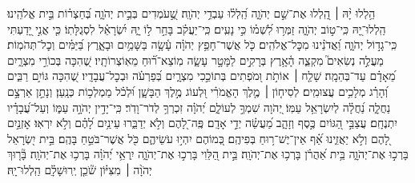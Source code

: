 \documentclass[twoside, openany, parskip=half, 11pt]{book}
\begin{document}
\begin{narrow}
הַ֥לְלוּ יָ֨הּ ׀  
הַֽ֭לְלוּ אֶת־שֵׁ֣ם יְהֹוָ֑ה הַֽ֝לְל֗וּ עַבְדֵ֥י יְהֹוָֽה׃
שֶׁ֣֭עֹמְדִים בְּבֵ֣ית יְהֹוָ֑ה בְּ֝חַצְר֗וֹת בֵּ֣ית אֱלֹהֵֽינוּ׃
הַֽלְלוּ־יָ֭הּ כִּֽי־ט֣וֹב יְהֹוָ֑ה זַמְּר֥וּ לִ֝שְׁמ֗וֹ כִּ֣י נָעִֽים׃
כִּֽי־יַעֲקֹ֗ב בָּחַ֣ר ל֣וֹ יָ֑הּ יִ֝שְׂרָאֵ֗ל לִסְגֻלָּתֽוֹ׃
כִּ֤י אֲנִ֣י יָ֭דַעְתִּי כִּֽי־גָד֣וֹל יְהֹוָ֑ה וַ֝אֲדֹנֵ֗ינוּ מִכׇּל־אֱלֹהִֽים׃
כֹּ֤ל אֲשֶׁר־חָפֵ֥ץ יְהֹוָ֗ה עָ֫שָׂ֥ה בַּשָּׁמַ֥יִם וּבָאָ֑רֶץ בַּ֝יַּמִּ֗ים וְכׇל־תְּהֹמֽוֹת׃
מַעֲלֶ֣ה נְשִׂאִים֮ מִקְצֵ֢ה הָ֫אָ֥רֶץ בְּרָקִ֣ים לַמָּטָ֣ר עָשָׂ֑ה מֽוֹצֵא־ר֗֝וּחַ מֵאֽוֹצְרוֹתָֽיו׃
שֶׁ֭הִכָּה בְּכוֹרֵ֣י מִצְרָ֑יִם מֵ֝אָדָ֗ם עַד־בְּהֵמָֽה׃
שָׁלַ֤ח ׀ אוֹתֹ֣ת וּ֭מֹפְתִים בְּתוֹכֵ֣כִי מִצְרָ֑יִם בְּ֝פַרְעֹ֗ה וּבְכׇל־עֲבָדָֽיו׃
שֶׁ֭הִכָּה גּוֹיִ֣ם רַבִּ֑ים וְ֝הָרַ֗ג מְלָכִ֥ים עֲצוּמִֽים׃
לְסִיח֤וֹן ׀ מֶ֤לֶךְ הָאֱמֹרִ֗י וּ֭לְעוֹג מֶ֣לֶךְ הַבָּשָׁ֑ן וּ֝לְכֹ֗ל מַמְלְכ֥וֹת כְּנָֽעַן׃
וְנָתַ֣ן אַרְצָ֣ם נַחֲלָ֑ה נַ֝חֲלָ֗ה לְיִשְׂרָאֵ֥ל עַמּֽוֹ׃
יְ֭הֹוָה שִׁמְךָ֣ לְעוֹלָ֑ם יְ֝הֹוָ֗ה זִכְרְךָ֥ לְדֹר־וָדֹֽר׃
כִּֽי־יָדִ֣ין יְהֹוָ֣ה עַמּ֑וֹ וְעַל־עֲ֝בָדָ֗יו יִתְנֶחָֽם׃
עֲצַבֵּ֣י הַ֭גּוֹיִם כֶּ֣סֶף וְזָהָ֑ב מַ֝עֲשֵׂ֗ה יְדֵ֣י אָדָֽם׃
פֶּֽה־לָ֭הֶם וְלֹ֣א יְדַבֵּ֑רוּ עֵינַ֥יִם לָ֝הֶ֗ם וְלֹ֣א יִרְאֽוּ׃
אׇזְנַ֣יִם לָ֭הֶם וְלֹ֣א יַאֲזִ֑ינוּ אַ֗֝ף אֵין־יֶשׁ־ר֥וּחַ בְּפִיהֶֽם׃
כְּ֭מוֹהֶם יִהְי֣וּ עֹשֵׂיהֶ֑ם כֹּ֖ל אֲשֶׁר־בֹּטֵ֣חַ בָּהֶֽם׃
בֵּ֣ית יִ֭שְׂרָאֵל בָּרְכ֣וּ אֶת־יְהֹוָ֑ה בֵּ֥ית אַ֝הֲרֹ֗ן בָּרְכ֥וּ אֶת־יְהֹוָֽה׃
בֵּ֣ית הַ֭לֵּוִי בָּרְכ֣וּ אֶת־יְהֹוָ֑ה יִֽרְאֵ֥י יְ֝הֹוָ֗ה בָּרְכ֥וּ אֶת־יְהֹוָֽה׃
בָּ֘ר֤וּךְ יְהֹוָ֨ה ׀ מִצִּיּ֗וֹן שֹׁ֘כֵ֤ן יְֽרוּשָׁלָ֗‍ִם הַֽלְלוּ־יָֽהּ׃ 




\end{narrow}
\end{document}
